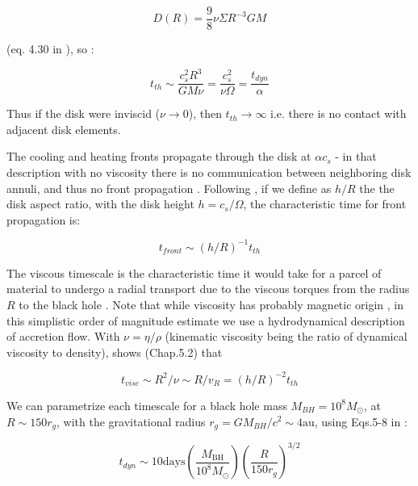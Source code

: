 \documentclass[twocolumn]{aastex62}
\begin{document}
\begin{equation}
D(R) = \frac{9}{8} \nu \Sigma R^{-3} G M
\end{equation}

(eq. 4.30 in \citealt{frank2002}), so :

\begin{equation}
t_{th} \sim \frac{c_{s}^{2}R^{3}}{G M \nu } = \frac{c_{s}^{2}}{\nu \Omega} = \frac{t_{dyn}}{\alpha}
\end{equation}

Thus if the disk were inviscid ($\nu \rightarrow 0$), then $t_{th}\rightarrow\infty$ i.e. there is no contact with adjacent disk elements. 

The cooling and heating fronts propagate through the disk at  $\alpha c_{s} $ \citep{hameury2009}  - in that description  with no viscosity there is no communication between neighboring disk annuli, and thus no front propagation \citep{balbus1998, balbus2003}. Following \cite{stern2018}, if we define as $h/R$  the the disk aspect ratio, with the disk height $h = c_{s} / \Omega$, the characteristic time for front propagation is:

\begin{equation}
t_{front} \sim (h/R) ^ {-1} t_{th}
\end{equation}


The viscous timescale is the characteristic time it would take for a parcel of material to undergo a radial transport due to the viscous torques from the radius $R$ to the black hole \citep{czerny2006}. Note that while viscosity has probably magnetic origin \citep{eardley1975, grzedzielski2017}, in this simplistic order of magnitude estimate we use a hydrodynamical description of accretion flow.  With $\nu = \eta / \rho$ (kinematic viscosity being the ratio of dynamical viscosity to density), \cite{frank2002} shows (Chap.5.2) that 

\begin{equation}
t_{visc} \sim R^{2} / \nu \sim  R / v_{R} = (h/R)^{-2} t_{th}
\end{equation}

 We can parametrize each timescale for a black hole mass $M_{BH} = 10^{8} M_{\odot}$, at $R \sim 150 r_{g}$, with the gravitational radius $r_{g} = GM_{BH} / c^{2} \sim 4 \mathrm{au}$, using Eqs.5-8 in \cite{stern2018} : 


 \begin{equation}
 t_{dyn} \sim 10  \mathrm{days} \left(\frac{M_{\mathrm{BH}}}{10^{8} M_{\odot}} \right) 
 \left( \frac{R}{150 r_{g}}\right) ^{3/2} 
 \end{equation}
\end{document}
